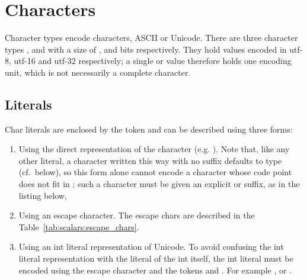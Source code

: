 \section{Characters}
\label{sec:scalars:char_type}

Character types encode characters, ASCII or Unicode. There are
three character types ,  and  with a size of
,  and  bits respectively. They hold values encoded
in utf-8, utf-16 and utf-32 respectively; a single  or 
value therefore holds one encoding unit, which is not necessarily a complete
character.


\subsection{Literals}

Char literals are enclosed by the token  and can be described using three forms:

\begin{enumerate}
  \setlength\itemsep{-4pt}
\item Using the direct representation of the character (e.g. ). Note
  that, like any other literal, a character written this way with no suffix
  defaults to type  (cf.~below), so this form alone cannot encode a
  character whose code point does not fit in ; such a character
  must be given an explicit  or  suffix, as in the
  listing below,
\item Using an escape character. The escape chars are described in the
  Table~\ref{tab:scalars:escape_chars}.

\item Using an int literal representation of Unicode. To avoid confusing the int
  literal representation with the literal of the int itself, the int literal
  must be encoded using the escape character  and the
  tokens \token{\{} and \token{\}}. For example
  ,  or
  .

\end{enumerate}


